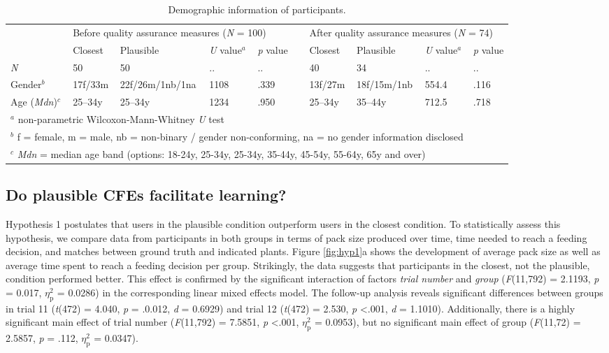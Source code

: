 \begin{table}
  \caption{Demographic information of participants.}
  \label{tab:participants}
\begin{tabular}{llllllllll} 
\toprule
    & \multicolumn{4}{l}{Before quality assurance measures (\textit{N} = 100)} && \multicolumn{4}{l}{After quality assurance measures (\textit{N} = 74)} \\
\cline{2-5}\cline{7-10}
    & Closest & Plausible & \textit{U} value$^a$ & \textit{p} value && Closest & Plausible & \textit{U} value$^a$ & \textit{p} value\\ 
\hline
\textit{N}   &  50 & 50 & .. & .. && 40 & 34 & .. & .. \\
Gender$^b$ & 17f/33m & 22f/26m/1nb/1na & 1108 & .339 && 13f/27m & 18f/15m/1nb & 554.4 & .116 \\
Age (\textit{Mdn})$^c$ & 25--34y & 25--34y & 1234 & .950 && 25--34y & 35--44y & 712.5 & .718 \\
\bottomrule
\multicolumn{9}{l}{$^a$ non-parametric Wilcoxon-Mann-Whitney \textit{U} test}\\
\multicolumn{9}{l}{$^b$ f = female, m = male, nb = non-binary / gender non-conforming, na = no gender information disclosed}\\
\multicolumn{9}{l}{$^c$ \textit{Mdn} = median age band (options: 18-24y, 25-34y, 25-34y, 35-44y, 45-54y, 55-64y, 65y and over)}
\end{tabular}
\end{table}

\subsection{Do plausible CFEs facilitate learning?}

Hypothesis 1 postulates that users in the plausible condition outperform users in the closest condition.
To statistically assess this hypothesis, we compare data from participants in both groups in terms of pack size produced over time, time needed to reach a feeding decision, and matches between ground truth and indicated plants.
Figure \ref{fig:hyp1}a shows the development of average pack size as well as average time spent to reach a feeding decision per group. 
Strikingly, the data suggests that participants in the closest, not the plausible, condition performed better. 
This effect is confirmed by the significant interaction of factors \textit{trial number} and \textit{group} (\textit{F}(11,792) = 2.1193, \textit{p} = 0.017, $\eta_{\text{p}}^{2}$ = 0.0286) in the corresponding linear mixed effects model. The follow-up analysis reveals significant differences between groups in trial 11 (\textit{t}(472) = 4.040, \textit{p} = .0.012, \textit{d} = 0.6929) and trial 12 (\textit{t}(472) = 2.530, \textit{p} \textless .001, \textit{d} = 1.1010).
Additionally, there is a highly significant main effect of trial number (\textit{F}(11,792) = 7.5851, \textit{p} \textless .001, $\eta_{\text{p}}^{2}$ = 0.0953), but no significant main effect of group (\textit{F}(11,72) = 2.5857, \textit{p} = .112, $\eta_{\text{p}}^{2}$ = 0.0347).

